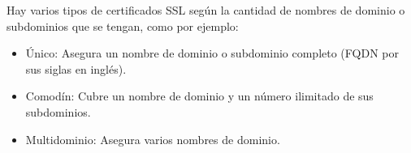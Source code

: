 \documentclass[12pt, a4paper, titlepage]{report}
\begin{document}
			Hay varios tipos de certificados SSL según la cantidad de nombres de dominio o subdominios que se tengan, como por ejemplo:
			
			\begin{itemize}
				\item \'Unico: Asegura un nombre de dominio o subdominio completo (FQDN por sus siglas en ingl\'es). 
				\item Comod\'in: Cubre un nombre de dominio y un n\'umero ilimitado de sus subdominios.
				\item Multidominio: Asegura varios nombres de dominio.
			\end{itemize}

\end{document}
